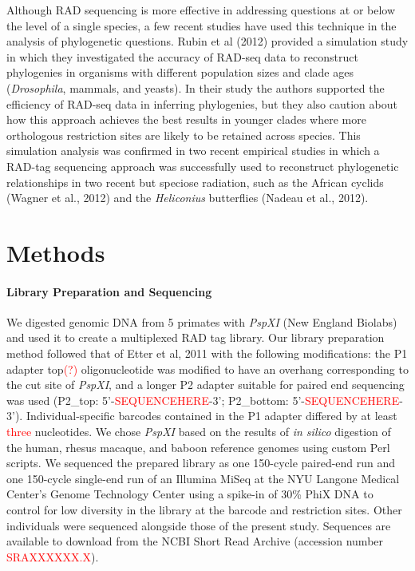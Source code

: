 \documentclass[12pt]{article}
\begin{document}
Although RAD sequencing is more effective in addressing questions at or below the level of a single species, a few recent studies have used this technique in the analysis of phylogenetic questions. Rubin et al (2012) provided a simulation study in which they investigated the accuracy of RAD-seq data to reconstruct phylogenies in organisms with different population sizes and clade ages (\emph{Drosophila}, mammals, and yeasts). In their study the authors supported the efficiency of RAD-seq data in inferring phylogenies, but they also caution about how this approach achieves the best results in younger clades where more orthologous restriction sites are likely to be retained across species. This simulation analysis was confirmed in two recent empirical studies in which a RAD-tag sequencing approach was successfully used to reconstruct phylogenetic relationships in two recent but speciose radiation, such as the African cyclids (Wagner et al., 2012) and the \emph{Heliconius} butterﬂies (Nadeau et al., 2012).

\section{Methods}

\paragraph{Library Preparation and Sequencing}

	We digested genomic DNA from 5 primates with \emph{PspXI} (New England Biolabs) and used it to create a multiplexed RAD tag library. Our library preparation method followed that of Etter et al, 2011 with the following modifications: the P1 adapter top\textcolor{red}{(?)} oligonucleotide was modified to have an overhang corresponding to the cut site of \emph{PspXI}, and a longer P2 adapter suitable for paired end sequencing was used (P2\_top: 5'-\textcolor{red}{SEQUENCEHERE}-3'; P2\_bottom: 5'-\textcolor{red}{SEQUENCEHERE}-3'). Individual-specific barcodes contained in the P1 adapter differed by at least \textcolor{red}{three} nucleotides. We chose \emph{PspXI} based on the results of \emph{in silico} digestion of the human, rhesus macaque, and baboon reference genomes using custom Perl scripts. We sequenced the prepared library as one 150-cycle paired-end run and one 150-cycle single-end run of an Illumina MiSeq at the NYU Langone Medical Center's Genome Technology Center using a spike-in of 30\% PhiX DNA to control for low diversity in the library at the barcode and restriction sites. Other individuals were sequenced alongside those of the present study. Sequences are available to download from the NCBI Short Read Archive (accession number \textcolor{red}{SRAXXXXXX.X}).
\end{document}
